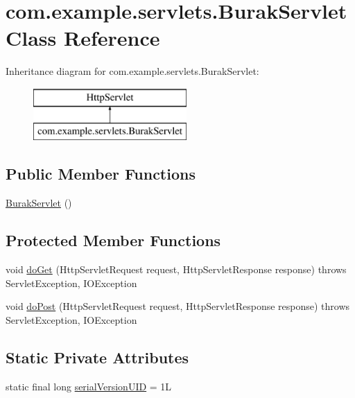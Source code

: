 \hypertarget{classcom_1_1example_1_1servlets_1_1_burak_servlet}{}\section{com.\+example.\+servlets.\+Burak\+Servlet Class Reference}
\label{classcom_1_1example_1_1servlets_1_1_burak_servlet}
Inheritance diagram for com.\+example.\+servlets.\+Burak\+Servlet\+:\begin{figure}[H]
\begin{center}
\leavevmode
\includegraphics[height=2.000000cm]{classcom_1_1example_1_1servlets_1_1_burak_servlet}
\end{center}
\end{figure}
\subsection*{Public Member Functions}
\begin{DoxyCompactItemize}
\item 
\hyperlink{classcom_1_1example_1_1servlets_1_1_burak_servlet_a933d316f89b292a7b8d4b84fdd551d45}{Burak\+Servlet} ()
\end{DoxyCompactItemize}
\subsection*{Protected Member Functions}
\begin{DoxyCompactItemize}
\item 
void \hyperlink{classcom_1_1example_1_1servlets_1_1_burak_servlet_afad2ce1980f63c828bcb6bb420276477}{do\+Get} (Http\+Servlet\+Request request, Http\+Servlet\+Response response)  throws Servlet\+Exception, I\+O\+Exception 
\item 
void \hyperlink{classcom_1_1example_1_1servlets_1_1_burak_servlet_ae2d3d9cb85c12eef39cd2145baaf75ef}{do\+Post} (Http\+Servlet\+Request request, Http\+Servlet\+Response response)  throws Servlet\+Exception, I\+O\+Exception 
\end{DoxyCompactItemize}
\subsection*{Static Private Attributes}
\begin{DoxyCompactItemize}
\item 
static final long \hyperlink{classcom_1_1example_1_1servlets_1_1_burak_servlet_a03b3133becc008e75537df6820aaef5c}{serial\+Version\+U\+I\+D} = 1\+L
\end{DoxyCompactItemize}


